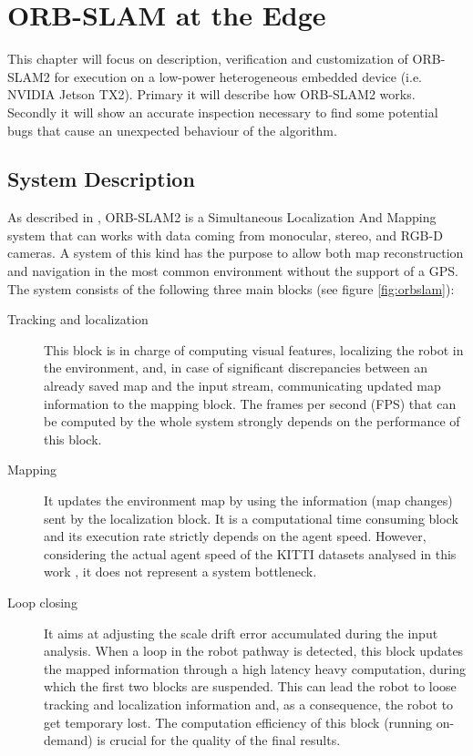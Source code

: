 \chapter{ORB-SLAM at the Edge} \label{chap:verification}
This chapter will focus on description, verification and customization of ORB-SLAM2 \cite{murORB2} for execution on a low-power heterogeneous embedded device (i.e. NVIDIA Jetson TX2). Primary it will describe how ORB-SLAM2 works. Secondly it will show an accurate inspection necessary to find some potential bugs that cause an unexpected behaviour of the algorithm.

 \section{System Description}
 As described in \cite{iros2019}, ORB-SLAM2 is a Simultaneous Localization And Mapping system that can works with data coming from monocular, stereo, and RGB-D cameras. A system of this kind has the purpose to allow both map reconstruction and navigation in the most common environment without the support of a GPS.
 The system consists of the following three main blocks (see figure \ref{fig:orbslam}):

\begin{description}
	\item[Tracking and localization] 
	This block is in charge of computing visual features, localizing the robot in the environment, and, in case of significant discrepancies between an already saved map and the input stream, communicating updated map information to the mapping block. The frames per second (FPS) that can be computed by the whole system strongly depends on the performance of this block.
	\item[Mapping] 
	It updates the environment map by using the information (map changes) sent by the localization block. It is a computational time consuming block and its execution rate strictly depends on the agent speed. However, considering the actual agent speed of the KITTI datasets analysed in this work \cite{CVPR2012}, it does not represent a system bottleneck.
	\item[Loop closing] 
	It aims at adjusting the scale drift error accumulated during the input analysis. When a loop in the robot pathway is detected, this block updates the mapped information through a high latency heavy computation, during which the first two blocks are suspended. This can lead the robot to loose tracking and localization information and, as a consequence, the robot to get temporary lost. The computation efficiency of this block (running on-demand) is crucial for the quality of the final results.
\end{description}

